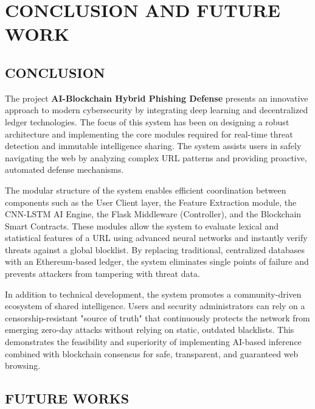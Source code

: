 
\newpage
\chapter{CONCLUSION AND FUTURE WORK}
\label{ch:conclusion}

\section{CONCLUSION}

The project \textbf{AI-Blockchain Hybrid Phishing Defense} presents an innovative approach to modern cybersecurity by integrating deep learning and decentralized ledger technologies. The focus of this system has been on designing a robust architecture and implementing the core modules required for real-time threat detection and immutable intelligence sharing. The system assists users in safely navigating the web by analyzing complex URL patterns and providing proactive, automated defense mechanisms.

The modular structure of the system enables efficient coordination between components such as the User Client layer, the Feature Extraction module, the CNN-LSTM AI Engine, the Flask Middleware (Controller), and the Blockchain Smart Contracts. These modules allow the system to evaluate lexical and statistical features of a URL using advanced neural networks and instantly verify threats against a global blocklist. By replacing traditional, centralized databases with an Ethereum-based ledger, the system eliminates single points of failure and prevents attackers from tampering with threat data.

In addition to technical development, the system promotes a community-driven ecosystem of shared intelligence. Users and security administrators can rely on a censorship-resistant "source of truth" that continuously protects the network from emerging zero-day attacks without relying on static, outdated blacklists. This demonstrates the feasibility and superiority of implementing AI-based inference combined with blockchain consensus for safe, transparent, and guaranteed web browsing.

\newpage
\section{FUTURE WORKS}

